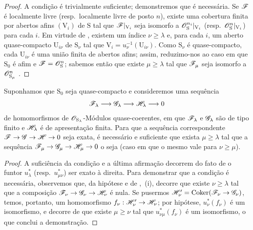 \begin{proof}
A condição é trivialmente suficiente; demonstremos que é necessária.
Se $\mathscr{F}$ é localmente livre (resp.\ localmente livre de posto $n$), existe uma cobertura finita por abertos afins $(\mathrm{V}_i)$ de $\mathrm{S}$ tal que $\mathscr{F}|_{\mathrm{V}_i}$ seja isomorfo a $\mathscr{O}_\mathrm{S}^{n_i}|_{\mathrm{V}_i}$ (resp.\ $\mathscr{O}_\mathrm{S}^n|_{\mathrm{V}_i}$) para cada $i$.
Em virtude de , existem um índice $\nu\geqslant\lambda$ e, para cada $i$, um aberto quase-compacto $\mathrm{U}_{i\nu}$ de $\mathrm{S}_\nu$ tal que $\mathrm{V}_i=u_\nu^{-1}(\mathrm{U}_{i\nu})$.
Como $\mathrm{S}_\nu$ é quase-compacto, cada $\mathrm{U}_{i\nu}$ é uma união finita de abertos afins; assim, reduzimo-nos ao caso em que $\mathrm{S}_0$ é afim e $\mathscr{F}=\mathscr{O}_\mathrm{S}^n$; sabemos então que existe $\mu\geqslant\lambda$ tal que $\mathscr{F}_\mu$ seja isomorfo a $\mathscr{O}_{\mathrm{S}_\mu}^n$ .
\end{proof}

\begin{proposition}[8.5.6]
\label{IV.8.5.6}
Suponhamos que $\mathrm{S}_0$ seja quase-compacto e consideremos uma sequência
\[
  \sh{F}_\lambda\to\sh{G}_\lambda\to\sh{H}_\lambda\to 0
\]
de homomorfismos de $\mathscr{O}_{\mathrm{S}_\lambda}$-Módulos quase-coerentes, em que $\mathscr{F}_\lambda$ e $\mathscr{G}_\lambda$ são de tipo finito e $\mathscr{H}_\lambda$ é de apresentação finita.
Para que a sequência correspondente $\sh{F}\to\sh{G}\to\sh{H}\to 0$ seja exata, é necessário e suficiente que exista $\mu\geqslant\lambda$ tal que a sequência $\sh{F}_\mu\to\sh{G}_\mu\to\sh{H}_\mu\to 0$ o seja (caso em que o mesmo vale para $\nu\geqslant\mu$).
\end{proposition}

\begin{proof}
A suficiência da condição e a última afirmação decorrem do fato de o funtor $u_\lambda^*$ (resp.\ $u_{\mu\nu}^*$) ser exato à direita.
Para demonstrar que a condição é necessária, observemos que, da hipótese e de ,~(i), decorre que existe $\nu\geqslant\lambda$ tal que a composição $\sh{F}_\nu\to\sh{G}_\nu\to\sh{H}_\nu$ é nula.
Se pusermos $\sh{H}'_\nu=\operatorname{Coker}(\sh{F}_\nu\to\sh{G}_\nu)$, temos, portanto, um homomorfismo $f_\nu:\sh{H}'_\nu\to\sh{H}_\nu$; por hipótese, $u_\nu^*(f_\nu)$ é um isomorfismo, e decorre de  que existe $\mu\geqslant\nu$ tal que $u_{\nu\mu}^*(f_\nu)$ é um isomorfismo, o que conclui a demonstração.
\end{proof}

